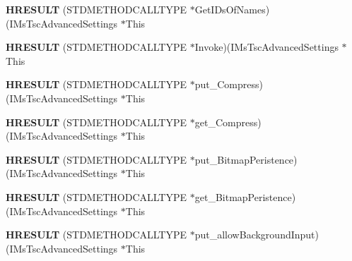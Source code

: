 \begin{DoxyCompactItemize}
{\bfseries H\+R\+E\+S\+U\+LT} (S\+T\+D\+M\+E\+T\+H\+O\+D\+C\+A\+L\+L\+T\+Y\+PE $\ast$Get\+I\+Ds\+Of\+Names)(I\+Ms\+Tsc\+Advanced\+Settings $\ast$This
\item 
\mbox{\label{struct_i_ms_tsc_advanced_settings_vtbl_afea7eff51d22b35b58dd3d605113d4d2}} 
{\bfseries H\+R\+E\+S\+U\+LT} (S\+T\+D\+M\+E\+T\+H\+O\+D\+C\+A\+L\+L\+T\+Y\+PE $\ast$Invoke)(I\+Ms\+Tsc\+Advanced\+Settings $\ast$This
\item 
\mbox{\label{struct_i_ms_tsc_advanced_settings_vtbl_a87b468ad4cd8eae0be7c7bb740aa8c51}} 
{\bfseries H\+R\+E\+S\+U\+LT} (S\+T\+D\+M\+E\+T\+H\+O\+D\+C\+A\+L\+L\+T\+Y\+PE $\ast$put\+\_\+\+Compress)(I\+Ms\+Tsc\+Advanced\+Settings $\ast$This
\item 
\mbox{\label{struct_i_ms_tsc_advanced_settings_vtbl_a67602d18216eaa7def74d8ef76b3e5f6}} 
{\bfseries H\+R\+E\+S\+U\+LT} (S\+T\+D\+M\+E\+T\+H\+O\+D\+C\+A\+L\+L\+T\+Y\+PE $\ast$get\+\_\+\+Compress)(I\+Ms\+Tsc\+Advanced\+Settings $\ast$This
\item 
\mbox{\label{struct_i_ms_tsc_advanced_settings_vtbl_a3e0a4b5ba21227c35814d5a1dd85bc64}} 
{\bfseries H\+R\+E\+S\+U\+LT} (S\+T\+D\+M\+E\+T\+H\+O\+D\+C\+A\+L\+L\+T\+Y\+PE $\ast$put\+\_\+\+Bitmap\+Peristence)(I\+Ms\+Tsc\+Advanced\+Settings $\ast$This
\item 
\mbox{\label{struct_i_ms_tsc_advanced_settings_vtbl_a4701fbfe797d882368cccb66e44c443d}} 
{\bfseries H\+R\+E\+S\+U\+LT} (S\+T\+D\+M\+E\+T\+H\+O\+D\+C\+A\+L\+L\+T\+Y\+PE $\ast$get\+\_\+\+Bitmap\+Peristence)(I\+Ms\+Tsc\+Advanced\+Settings $\ast$This
\item 
\mbox{\label{struct_i_ms_tsc_advanced_settings_vtbl_a1a927f41c8b68aa88d4533cf9d922984}} 
{\bfseries H\+R\+E\+S\+U\+LT} (S\+T\+D\+M\+E\+T\+H\+O\+D\+C\+A\+L\+L\+T\+Y\+PE $\ast$put\+\_\+allow\+Background\+Input)(I\+Ms\+Tsc\+Advanced\+Settings $\ast$This
\item 
\mbox{\label{struct_i_ms_tsc_advanced_settings_vtbl_aae4665578ef88edb52394f0f51075475}} 

\end{DoxyCompactItemize}
